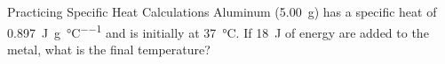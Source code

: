 \documentclass[handout]{beamer}
\begin{document}
%

\begin{frame}[t]{Practicing Specific Heat Calculations}
	Aluminum (\SI{5.00}{\gram}) has a specific heat of
	\SI{0.897}{\joule\per\gram\per\celsius} and is initially at
	\SI{37}{\celsius}. If \SI{18}{\joule} of energy are added to the metal,
	what is the final temperature?

\end{frame}
\end{document}
